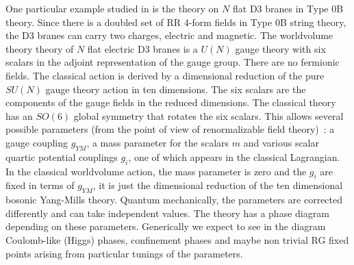 One particular example studied in \cite{Klebanov:1998db} is the theory
on $N$ flat D3 branes in Type 0B theory.  Since there is a doubled set
of RR 4-form fields in Type 0B string theory, the D3 branes can carry
two charges, electric and magnetic.  The worldvolume theory theory of
$N$ flat electric D3 branes is a $U(N)$ gauge theory with six scalars
in the adjoint representation of the gauge group.  There are no
fermionic fields.  The classical action is derived by a dimensional
reduction of the pure $SU(N)$ gauge theory action in ten dimensions.
The six scalars are the components of the gauge fields in the reduced
dimensions. The
 classical theory has an $SO(6)$ global symmetry that rotates the
six scalars.  This allows several possible parameters (from the point
of view of renormalizable field theory)~: a gauge coupling $g_{YM}$, a
mass parameter for the scalars $m$ and various scalar quartic
potential couplings $g_i$, one of which appears in the classical 
  Lagrangian.  In the classical worldvolume 
 action, the mass
parameter is zero and the $g_i$ are fixed in terms of $g_{YM}$, it
is just the dimensional reduction of the ten dimensional 
bosonic Yang-Mills theory.
Quantum mechanically, the parameters are corrected differently and can
take independent values.  The theory has a phase diagram depending on
these parameters.  Generically we expect to see in the diagram
Coulomb-like (Higgs) phases, confinement phases and maybe non trivial
RG fixed points arising from particular tunings of the parameters.

